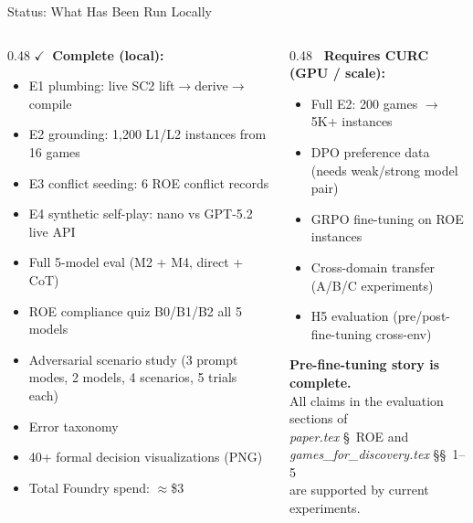 \documentclass[aspectratio=169, 10pt]{beamer}
\newcommand{\roecheck}{\textcolor{ROEGreen}{$\checkmark$}}
\begin{document}
\begin{frame}{Status: What Has Been Run Locally}

  \begin{columns}[T]
    \begin{column}{0.48\textwidth}
      \textbf{\roecheck\ Complete (local):}
      \begin{itemize}[leftmargin=1.2em, itemsep=2pt]
        \item E1 plumbing: live SC2 lift$\to$derive$\to$compile
        \item E2 grounding: 1,200 L1/L2 instances from 16 games
        \item E3 conflict seeding: 6 ROE conflict records
        \item E4 synthetic self-play: nano vs GPT-5.2 live API
        \item Full 5-model eval (M2 + M4, direct + CoT)
        \item ROE compliance quiz B0/B1/B2 all 5 models
        \item Adversarial scenario study (3 prompt modes,
              2 models, 4 scenarios, 5 trials each)
        \item Error taxonomy
        \item 40+ formal decision visualizations (PNG)
        \item Total Foundry spend: $\approx$\$3
      \end{itemize}
    \end{column}

    \begin{column}{0.48\textwidth}
      \textbf{\alert{\texttimes}\ Requires CURC (GPU / scale):}
      \begin{itemize}[leftmargin=1.2em, itemsep=2pt]
        \item Full E2: 200 games $\to$ 5K+ instances
        \item DPO preference data (needs weak/strong model pair)
        \item GRPO fine-tuning on ROE instances
        \item Cross-domain transfer (A/B/C experiments)
        \item H5 evaluation (pre/post-fine-tuning cross-env)
      \end{itemize}

      \vspace{0.5em}
      \textbf{Pre-fine-tuning story is complete.}\\[0.3em]
      All claims in the evaluation sections of\\
      \textit{paper.tex} §~ROE and\\
      \textit{games\_for\_discovery.tex} §§~1--5\\
      are supported by current experiments.
    \end{column}
  \end{columns}
\end{frame}
\end{document}
